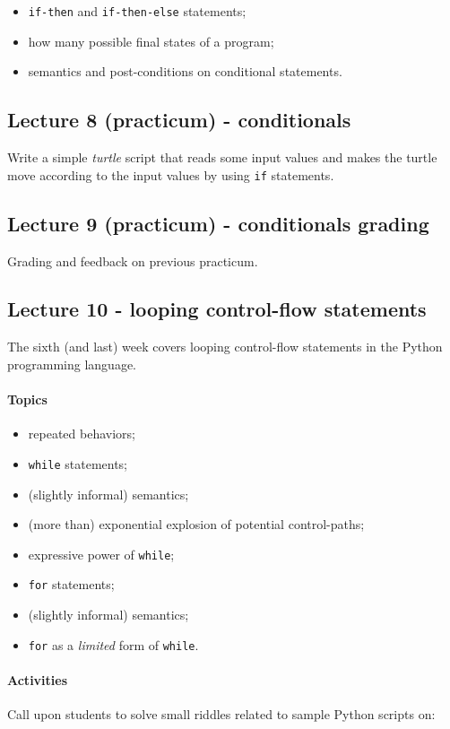 \documentclass[12pt,a4paper,final]{article}
\begin{document}
\begin{itemize}
\item \texttt{if-then} and \texttt{if-then-else} statements;
\item how many possible final states of a program;
\item semantics and post-conditions on conditional statements.
\end{itemize}


\subsection{Lecture 8 (practicum) - conditionals}
Write a simple \textit{turtle} script that reads some input values and makes the turtle move according to the input values by using \texttt{if} statements.


\subsection{Lecture 9 (practicum) - conditionals grading}
Grading and feedback on previous practicum.


\subsection{Lecture 10 - looping control-flow statements}
The sixth (and last) week covers looping control-flow statements in the Python programming language.

\paragraph*{Topics}
\begin{itemize}
\item repeated behaviors;
\item \texttt{while} statements;
\item (slightly informal) semantics;
\item (more than) exponential explosion of potential control-paths;
\item expressive power of \texttt{while};
\item \texttt{for} statements;
\item (slightly informal) semantics;
\item \texttt{for} as a \textit{limited} form of \texttt{while}.
\end{itemize}

\paragraph*{Activities}
Call upon students to solve small riddles related to sample Python scripts on:
\end{document}
